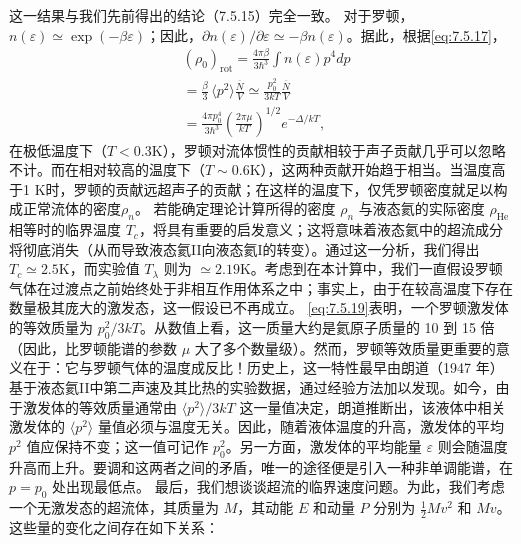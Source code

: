 这一结果与我们先前得出的结论（7.5.15）完全一致。
对于罗顿，\(n(\varepsilon) \simeq \exp(-\beta \varepsilon)\)；因此，\(\partial n(\varepsilon)/\partial \varepsilon \simeq -\beta n(\varepsilon)\)。据此，根据\autoref{eq:7.5.17}，
\begin{equation}\tag{7.5.36}\label{eq:7.5.36}
\begin{array}{rl} & { ( \rho _ { 0 } ) _ { \mathrm { r o t } } = \frac { 4 \pi \beta } { 3 \hbar ^{3} } \int n ( \varepsilon ) p ^{4} d p } \\& {  = \frac { \beta } { 3 } \, \langle p ^{2} \rangle \frac { \overline { { N } } } { V } \simeq \frac { p _ { 0 } ^{2} } { 3 k T } \frac { \overline { { N } } } { V } } \\& {  = \frac { 4 \pi p _ { 0 } ^{4} } { 3 \hbar ^{3} } \left( \frac { 2 \pi \mu } { k T } \right) ^{1 / 2} e ^{- \Delta / k T} , } \end{array}
\end{equation}
在极低温度下（\(T < 0.3\)K），罗顿对流体惯性的贡献相较于声子贡献几乎可以忽略不计。而在相对较高的温度下（\(T \sim 0.6\)K），这两种贡献开始趋于相当。当温度高于1 K时，罗顿的贡献远超声子的贡献；在这样的温度下，仅凭罗顿密度就足以构成正常流体的密度\(\rho_{n}\)。
若能确定理论计算所得的密度 \(\rho_{n}\) 与液态氦的实际密度 \(\rho_{\mathrm{He}}\) 相等时的临界温度 \(T_{c}\)，将具有重要的启发意义；这将意味着液态氦中的超流成分将彻底消失（从而导致液态氦II向液态氦I的转变）。通过这一分析，我们得出 \(T_{c} \simeq 2.5 \mathrm{K}\)，而实验值 \(T_{\lambda}\) 则为 \(\simeq 2.19 \mathrm{K}\)。考虑到在本计算中，我们一直假设罗顿气体在过渡点之前始终处于非相互作用体系之中；事实上，由于在较高温度下存在数量极其庞大的激发态，这一假设已不再成立。
\autoref{eq:7.5.19}表明，一个罗顿激发体的等效质量为 \(p_{0}^{2}/3kT\)。从数值上看，这一质量大约是氦原子质量的 10 到 15 倍（因此，比罗顿能谱的参数 \(\mu\) 大了多个数量级）。然而，罗顿等效质量更重要的意义在于：它与罗顿气体的温度成反比！历史上，这一特性最早由朗道（1947 年）基于液态氦II中第二声速及其比热的实验数据，通过经验方法加以发现。如今，由于激发体的等效质量通常由 \(\langle p^{2}\rangle/3kT\) 这一量值决定，朗道推断出，该液体中相关激发体的 \(\langle p^{2}\rangle\) 量值必须与温度无关。因此，随着液体温度的升高，激发体的平均 \(p^{2}\) 值应保持不变；这一值可记作 \(p_{0}^{2}\)。另一方面，激发体的平均能量 \(\varepsilon\) 则会随温度升高而上升。要调和这两者之间的矛盾，唯一的途径便是引入一种非单调能谱，在 \(p=p_{0}\) 处出现最低点。
最后，我们想谈谈超流的临界速度问题。为此，我们考虑一个无激发态的超流体，其质量为 \(M\)，其动能 \(E\) 和动量 \(P\) 分别为 \(\frac{1}{2}Mv^2\) 和 \(Mv\)。这些量的变化之间存在如下关系：
